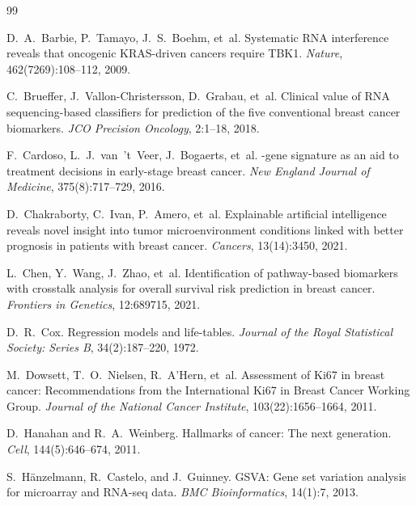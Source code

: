 \documentclass[11pt]{article}
\begin{document}

\begin{thebibliography}{99}

D.~A.~Barbie, P.~Tamayo, J.~S.~Boehm, et~al.
\newblock Systematic RNA interference reveals that oncogenic KRAS-driven cancers require TBK1.
\newblock \textit{Nature}, 462(7269):108--112, 2009.

C.~Brueffer, J.~Vallon-Christersson, D.~Grabau, et~al.
\newblock Clinical value of RNA sequencing-based classifiers for prediction of the five conventional breast cancer biomarkers.
\newblock \textit{JCO Precision Oncology}, 2:1--18, 2018.

F.~Cardoso, L.~J.~van~'t~Veer, J.~Bogaerts, et~al.
-gene signature as an aid to treatment decisions in early-stage breast cancer.
\newblock \textit{New England Journal of Medicine}, 375(8):717--729, 2016.

D.~Chakraborty, C.~Ivan, P.~Amero, et~al.
\newblock Explainable artificial intelligence reveals novel insight into tumor microenvironment conditions linked with better prognosis in patients with breast cancer.
\newblock \textit{Cancers}, 13(14):3450, 2021.

L.~Chen, Y.~Wang, J.~Zhao, et~al.
\newblock Identification of pathway-based biomarkers with crosstalk analysis for overall survival risk prediction in breast cancer.
\newblock \textit{Frontiers in Genetics}, 12:689715, 2021.

D.~R.~Cox.
\newblock Regression models and life-tables.
\newblock \textit{Journal of the Royal Statistical Society: Series B}, 34(2):187--220, 1972.

M.~Dowsett, T.~O.~Nielsen, R.~A'Hern, et~al.
\newblock Assessment of Ki67 in breast cancer: Recommendations from the International Ki67 in Breast Cancer Working Group.
\newblock \textit{Journal of the National Cancer Institute}, 103(22):1656--1664, 2011.

D.~Hanahan and R.~A.~Weinberg.
\newblock Hallmarks of cancer: The next generation.
\newblock \textit{Cell}, 144(5):646--674, 2011.

S.~H\"{a}nzelmann, R.~Castelo, and J.~Guinney.
\newblock GSVA: Gene set variation analysis for microarray and RNA-seq data.
\newblock \textit{BMC Bioinformatics}, 14(1):7, 2013.


\end{thebibliography}
\end{document}
